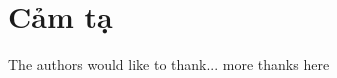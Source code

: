 \documentclass[10pt, conference, a4paper, compsocconf]{IEEEtran}
\begin{document}


\section*{Cảm tạ}


The authors would like to thank...
more thanks here










\end{document}
